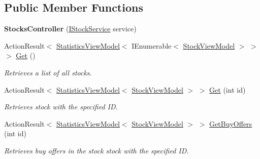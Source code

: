 \subsection*{Public Member Functions}
\begin{DoxyCompactItemize}
\item 
\mbox{\label{class_gielda_l2_1_1_a_p_i_1_1_controllers_1_1_stocks_controller_aa73b302e38b975dfaf012de7c5478a70}} 
{\bfseries Stocks\+Controller} (\mbox{\hyperlink{interface_gielda_l2_1_1_i_n_f_r_a_s_t_r_u_c_t_u_r_e_1_1_interfaces_1_1_i_stock_service}{I\+Stock\+Service}} service)
\item 
Action\+Result$<$ \mbox{\hyperlink{class_gielda_l2_1_1_a_p_i_1_1_view_models_1_1_view_1_1_statistics_view_model}{Statistics\+View\+Model}}$<$ I\+Enumerable$<$ \mbox{\hyperlink{class_gielda_l2_1_1_a_p_i_1_1_view_models_1_1_view_1_1_stock_view_model}{Stock\+View\+Model}} $>$ $>$ $>$ \mbox{\hyperlink{class_gielda_l2_1_1_a_p_i_1_1_controllers_1_1_stocks_controller_a3265a9c160c9a1f7f493423739f90561}{Get}} ()
\begin{DoxyCompactList}\small\item\em Retrieves a list of all stocks. \end{DoxyCompactList}\item 
Action\+Result$<$ \mbox{\hyperlink{class_gielda_l2_1_1_a_p_i_1_1_view_models_1_1_view_1_1_statistics_view_model}{Statistics\+View\+Model}}$<$ \mbox{\hyperlink{class_gielda_l2_1_1_a_p_i_1_1_view_models_1_1_view_1_1_stock_view_model}{Stock\+View\+Model}} $>$ $>$ \mbox{\hyperlink{class_gielda_l2_1_1_a_p_i_1_1_controllers_1_1_stocks_controller_acbb679302b68f67ebfc9c22184332f27}{Get}} (int id)
\begin{DoxyCompactList}\small\item\em Retrieves stock with the specified ID. \end{DoxyCompactList}\item 
Action\+Result$<$ \mbox{\hyperlink{class_gielda_l2_1_1_a_p_i_1_1_view_models_1_1_view_1_1_statistics_view_model}{Statistics\+View\+Model}}$<$ \mbox{\hyperlink{class_gielda_l2_1_1_a_p_i_1_1_view_models_1_1_view_1_1_stock_view_model}{Stock\+View\+Model}} $>$ $>$ \mbox{\hyperlink{class_gielda_l2_1_1_a_p_i_1_1_controllers_1_1_stocks_controller_a5ff967325fc88fb37906dbfb7ca90a27}{Get\+Buy\+Offers}} (int id)
\begin{DoxyCompactList}\small\item\em Retrieves buy offers in the stock stock with the specified ID. \end{DoxyCompactList}\item 

\end{DoxyCompactItemize}
